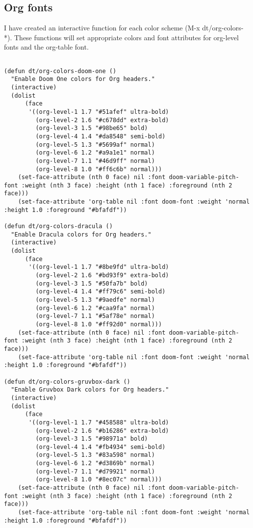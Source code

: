 \documentclass[11pt]{article}
\begin{document}
\subsection{Org fonts}
\label{sec:orgdf9a06d}
I have created an interactive function for each color scheme (M-x dt/org-colors-*).  These functions will set appropriate colors and font attributes for org-level fonts and the org-table font.
\begin{verbatim}

(defun dt/org-colors-doom-one ()
  "Enable Doom One colors for Org headers."
  (interactive)
  (dolist
      (face
       '((org-level-1 1.7 "#51afef" ultra-bold)
         (org-level-2 1.6 "#c678dd" extra-bold)
         (org-level-3 1.5 "#98be65" bold)
         (org-level-4 1.4 "#da8548" semi-bold)
         (org-level-5 1.3 "#5699af" normal)
         (org-level-6 1.2 "#a9a1e1" normal)
         (org-level-7 1.1 "#46d9ff" normal)
         (org-level-8 1.0 "#ff6c6b" normal)))
    (set-face-attribute (nth 0 face) nil :font doom-variable-pitch-font :weight (nth 3 face) :height (nth 1 face) :foreground (nth 2 face)))
    (set-face-attribute 'org-table nil :font doom-font :weight 'normal :height 1.0 :foreground "#bfafdf"))

(defun dt/org-colors-dracula ()
  "Enable Dracula colors for Org headers."
  (interactive)
  (dolist
      (face
       '((org-level-1 1.7 "#8be9fd" ultra-bold)
         (org-level-2 1.6 "#bd93f9" extra-bold)
         (org-level-3 1.5 "#50fa7b" bold)
         (org-level-4 1.4 "#ff79c6" semi-bold)
         (org-level-5 1.3 "#9aedfe" normal)
         (org-level-6 1.2 "#caa9fa" normal)
         (org-level-7 1.1 "#5af78e" normal)
         (org-level-8 1.0 "#ff92d0" normal)))
    (set-face-attribute (nth 0 face) nil :font doom-variable-pitch-font :weight (nth 3 face) :height (nth 1 face) :foreground (nth 2 face)))
    (set-face-attribute 'org-table nil :font doom-font :weight 'normal :height 1.0 :foreground "#bfafdf"))

(defun dt/org-colors-gruvbox-dark ()
  "Enable Gruvbox Dark colors for Org headers."
  (interactive)
  (dolist
      (face
       '((org-level-1 1.7 "#458588" ultra-bold)
         (org-level-2 1.6 "#b16286" extra-bold)
         (org-level-3 1.5 "#98971a" bold)
         (org-level-4 1.4 "#fb4934" semi-bold)
         (org-level-5 1.3 "#83a598" normal)
         (org-level-6 1.2 "#d3869b" normal)
         (org-level-7 1.1 "#d79921" normal)
         (org-level-8 1.0 "#8ec07c" normal)))
    (set-face-attribute (nth 0 face) nil :font doom-variable-pitch-font :weight (nth 3 face) :height (nth 1 face) :foreground (nth 2 face)))
    (set-face-attribute 'org-table nil :font doom-font :weight 'normal :height 1.0 :foreground "#bfafdf"))


\end{verbatim}
\end{document}
